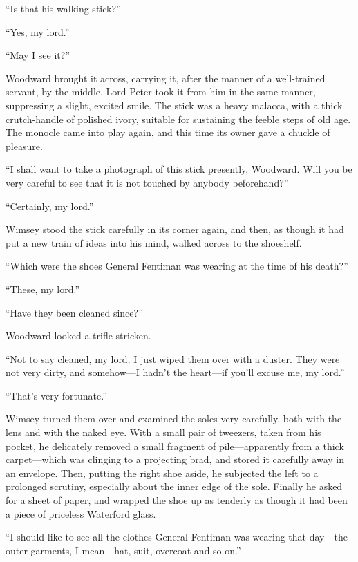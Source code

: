 \enquote{Is that his walking-stick?}

\enquote{Yes, my lord.}

\enquote{May I see it?}

Woodward brought it across, carrying it, after the manner of a well-trained servant, by the middle. Lord Peter took it from him in the same manner, suppressing a slight, excited smile. The stick was a heavy malacca, with a thick crutch-handle of polished ivory, suitable for sustaining the feeble steps of old age. The monocle came into play again, and this time its owner gave a chuckle of pleasure.

\enquote{I shall want to take a photograph of this stick presently, Woodward. Will you be very careful to see that it is not touched by anybody beforehand?}

\enquote{Certainly, my lord.}

Wimsey stood the stick carefully in its corner again, and then, as though it had put a new train of ideas into his mind, walked across to the shoeshelf.

\enquote{Which were the shoes General Fentiman was wearing at the time of his death?}

\enquote{These, my lord.}

\enquote{Have they been cleaned since?}

Woodward looked a trifle stricken.

\enquote{Not to say cleaned, my lord. I just wiped them over with a duster. They were not very dirty, and somehow\allowbreak---\allowbreak I hadn't the heart\allowbreak---\allowbreak if you'll excuse me, my lord.}

\enquote{That's very fortunate.}

Wimsey turned them over and examined the soles very carefully, both with the lens and with the naked eye. With a small pair of tweezers, taken from his pocket, he delicately removed a small fragment of pile\allowbreak---\allowbreak apparently from a thick carpet\allowbreak---\allowbreak which was clinging to a projecting brad, and stored it carefully away in an envelope. Then, putting the right shoe aside, he subjected the left to a prolonged scrutiny, especially about the inner edge of the sole. Finally he asked for a sheet of paper, and wrapped the shoe up as tenderly as though it had been a piece of priceless Waterford glass.

\enquote{I should like to see all the clothes General Fentiman was wearing that day\allowbreak---\allowbreak the outer garments, I mean\allowbreak---\allowbreak hat, suit, overcoat and so on.}

